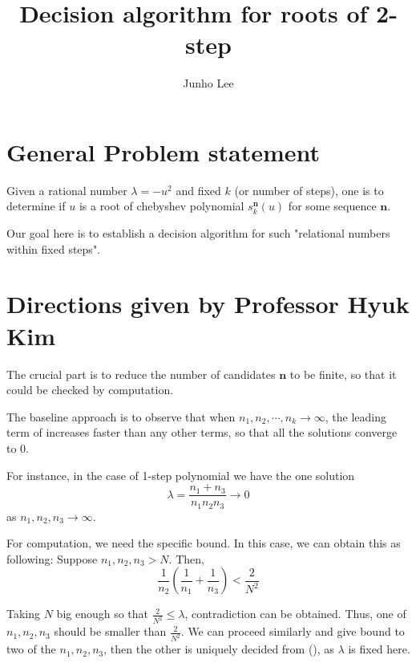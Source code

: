 \documentclass{article}
\title{Decision algorithm for roots of 2-step}
\author{Junho Lee}
\theoremstyle{definition}
\theoremstyle{plain}
\theoremstyle{remark}
\numberwithin{equation}{section}
\begin{document}
\pagecolor{white}
\color{black}
\maketitle

\section{General Problem statement}

Given a rational number $\lambda = -u^2$ and fixed $k$ (or number of steps),
one is to determine if $u$ is a root of chebyshev polynomial $s^\mathbf{n}_k(u)$ for some sequence $\mathbf{n}$.

Our goal here is to establish a decision algorithm for such "relational numbers within fixed steps".

\section{Directions given by Professor Hyuk Kim}

The crucial part is to reduce the number of candidates $\mathbf{n}$ to be finite,
so that it could be checked by computation.

The baseline approach is to observe that when $n_1, n_2, \cdots, n_k \to \infty$,
the leading term of increases faster than any other terms,
so that all the solutions converge to $0$.

For instance, in the case of 1-step polynomial we have the one solution
\begin{equation}\label{eqn:1stepsol}
  \lambda = \frac{n_1 + n_3}{n_1 n_2 n_3} \to 0
\end{equation}
as $n_1, n_2, n_3 \to \infty$.

For computation, we need the specific bound.
In this case, we can obtain this as following:
Suppose $n_1, n_2, n_3 > N$. Then,
\[
  \frac{1}{n_2} (\frac{1}{n_1} + \frac{1}{n_3}) < \frac{2}{N^2}
\]

\begin{figure}[h!]
  \centering
\end{figure}

Taking $N$ big enough so that $\frac{2}{N^2} \leq \lambda$,
contradiction can be obtained.
Thus, one of $n_1, n_2, n_3$ should be smaller than $\frac{2}{N^2}$.
We can proceed similarly and give bound to two of the $n_1, n_2, n_3$,
then the other is uniquely decided from (), as $\lambda$ is fixed here.
\end{document}
